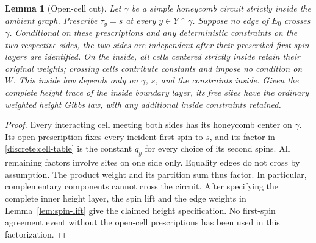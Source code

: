 \documentclass[11pt]{article}
\newtheorem{lemma}[theorem]{Lemma}
\theoremstyle{definition}
\theoremstyle{remark}
\numberwithin{equation}{section}
\begin{document}
\begin{samepage}
\begin{lemma}[Open-cell cut]\label{lem:cell-cut}
Let $\gamma$ be a simple honeycomb circuit strictly inside the ambient graph.
Prescribe $\tau_y=s$ at every $y\in Y\cap\gamma$. Suppose no edge of $E_0$
crosses $\gamma$. Conditional on these prescriptions and any deterministic
constraints on the two respective sides, the two sides are independent
after their prescribed first-spin layers are identified. On the inside,
all cells centered strictly inside retain their original weights; crossing
cells contribute constants and impose no condition on $W$. This inside law
depends only on $\gamma$, $s$, and the constraints inside. Given the complete
height trace of the inside boundary layer, its free sites have the ordinary
weighted height Gibbs law, with any additional inside constraints retained.
\end{lemma}
\end{samepage}
\begin{proof}
Every interacting cell meeting both sides has its honeycomb center on
$\gamma$. Its open prescription fixes every incident first spin to $s$,
and its factor in \eqref{discrete:cell-table} is the constant $q_y$ for
every choice of its second spins. All remaining factors involve sites on
one side only. Equality edges do not cross by assumption. The product
weight and its partition sum thus factor. In particular, complementary
components cannot cross the circuit. After specifying the complete inner
height layer, the spin lift and the edge weights in
Lemma~\ref{lem:spin-lift} give the claimed height specification. No
first-spin agreement event without the open-cell prescriptions has been
used in this factorization.
\end{proof}
\end{document}
